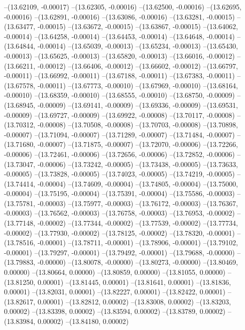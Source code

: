 --(13.62109, -0.00017)
--(13.62305, -0.00016)
--(13.62500, -0.00016)
--(13.62695, -0.00016)
--(13.62891, -0.00016)
--(13.63086, -0.00016)
--(13.63281, -0.00015)
--(13.63477, -0.00015)
--(13.63672, -0.00015)
--(13.63867, -0.00015)
--(13.64062, -0.00014)
--(13.64258, -0.00014)
--(13.64453, -0.00014)
--(13.64648, -0.00014)
--(13.64844, -0.00014)
--(13.65039, -0.00013)
--(13.65234, -0.00013)
--(13.65430, -0.00013)
--(13.65625, -0.00013)
--(13.65820, -0.00013)
--(13.66016, -0.00012)
--(13.66211, -0.00012)
--(13.66406, -0.00012)
--(13.66602, -0.00012)
--(13.66797, -0.00011)
--(13.66992, -0.00011)
--(13.67188, -0.00011)
--(13.67383, -0.00011)
--(13.67578, -0.00011)
--(13.67773, -0.00010)
--(13.67969, -0.00010)
--(13.68164, -0.00010)
--(13.68359, -0.00010)
--(13.68555, -0.00010)
--(13.68750, -0.00009)
--(13.68945, -0.00009)
--(13.69141, -0.00009)
--(13.69336, -0.00009)
--(13.69531, -0.00009)
--(13.69727, -0.00009)
--(13.69922, -0.00008)
--(13.70117, -0.00008)
--(13.70312, -0.00008)
--(13.70508, -0.00008)
--(13.70703, -0.00008)
--(13.70898, -0.00007)
--(13.71094, -0.00007)
--(13.71289, -0.00007)
--(13.71484, -0.00007)
--(13.71680, -0.00007)
--(13.71875, -0.00007)
--(13.72070, -0.00006)
--(13.72266, -0.00006)
--(13.72461, -0.00006)
--(13.72656, -0.00006)
--(13.72852, -0.00006)
--(13.73047, -0.00006)
--(13.73242, -0.00005)
--(13.73438, -0.00005)
--(13.73633, -0.00005)
--(13.73828, -0.00005)
--(13.74023, -0.00005)
--(13.74219, -0.00005)
--(13.74414, -0.00004)
--(13.74609, -0.00004)
--(13.74805, -0.00004)
--(13.75000, -0.00004)
--(13.75195, -0.00004)
--(13.75391, -0.00004)
--(13.75586, -0.00003)
--(13.75781, -0.00003)
--(13.75977, -0.00003)
--(13.76172, -0.00003)
--(13.76367, -0.00003)
--(13.76562, -0.00003)
--(13.76758, -0.00003)
--(13.76953, -0.00002)
--(13.77148, -0.00002)
--(13.77344, -0.00002)
--(13.77539, -0.00002)
--(13.77734, -0.00002)
--(13.77930, -0.00002)
--(13.78125, -0.00002)
--(13.78320, -0.00001)
--(13.78516, -0.00001)
--(13.78711, -0.00001)
--(13.78906, -0.00001)
--(13.79102, -0.00001)
--(13.79297, -0.00001)
--(13.79492, -0.00001)
--(13.79688, -0.00000)
--(13.79883, -0.00000)
--(13.80078, -0.00000)
--(13.80273, -0.00000)
--(13.80469, 0.00000)
--(13.80664, 0.00000)
--(13.80859, 0.00000)
--(13.81055, 0.00000)
--(13.81250, 0.00001)
--(13.81445, 0.00001)
--(13.81641, 0.00001)
--(13.81836, 0.00001)
--(13.82031, 0.00001)
--(13.82227, 0.00001)
--(13.82422, 0.00001)
--(13.82617, 0.00001)
--(13.82812, 0.00002)
--(13.83008, 0.00002)
--(13.83203, 0.00002)
--(13.83398, 0.00002)
--(13.83594, 0.00002)
--(13.83789, 0.00002)
--(13.83984, 0.00002)
--(13.84180, 0.00002)
